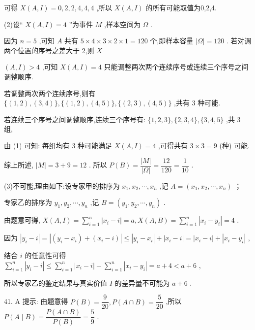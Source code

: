可得 $X\left( {A,I}\right)  = 0,2,2,4,4,4$ ,所以 $X\left( {A,I}\right)$ 的所有可能取值为0,2,4.

(2)设“ $X\left( {A,I}\right)  = 4$ ”为事件 $M$ ,样本空间为 $\Omega$ .

因为 $n = 5$ ,可知 $A$ 共有 $5 \times  4 \times  3 \times  2 \times  1 = {120}$ 个,即样本容量 $\left| \Omega \right|  = {120}$ . 若对调两个位置的序号之差大于 2,则 $X$

$\left( {A,I}\right)  > 4$ ,可知 $X\left( {A,I}\right)  = 4$ 只能调整两次两个连续序号或连续三个序号之间调整顺序.

若调整两次两个连续序号,则有 $\{ \left( {1,2}\right) ,\left( {3,4}\right) \} ,\{ \left( {1,2}\right) ,\left( {4,5}\right) \} ,\{ \left( {2,3}\right) ,\left( {4,5}\right) \}$ ,共有 3 种可能.

若连续三个序号之间调整顺序,连续三个序号有: $\{ 1,2,3\} ,\{ 2,3,4\} ,\{ 3,4,5\}$ ,共 3 组,

由 (1) 可知: 每组均有 3 种可能满足 $X\left( {A,I}\right)  = 4$ ,可得共有 $3 \times  3 = 9$ (种) 可能.

综上所述, $\left| M\right|  = 3 + 9 = {12}$ . 所以 $P\left( B\right)  = \dfrac{\left| M\right| }{\left| \Omega \right| } = \dfrac{12}{120} = \dfrac{1}{10}$ .

(3)不可能,理由如下:设专家甲的排序为 ${x}_{1},{x}_{2},\cdots ,{x}_{n}$ ,记 $A = \left( {{x}_{1},{x}_{2},\cdots ,{x}_{n}}\right)$ ；

专家乙的排序为 ${y}_{1},{y}_{2},\cdots ,{y}_{n}$ ,记 $B = \left( {{y}_{1},{y}_{2},\cdots ,{y}_{n}}\right)$ .

由题意可得, $X\left( {A,I}\right)  = \mathop{\sum }\limits_{{i = 1}}^{n}\left| {{x}_{i} - i}\right|  = a,X\left( {A,B}\right)  = \mathop{\sum }\limits_{{i = 1}}^{n}\left| {{x}_{i} - {y}_{i}}\right|  = 4$ .

因为 $\left| {{y}_{i} - i}\right|  = \left| {\left( {{y}_{i} - {x}_{i}}\right)  + \left( {{x}_{i} - i}\right) }\right|  \leq  \left| {{y}_{i} - {x}_{i}}\right|  + \left| {{x}_{i} - i}\right|  = \left| {{x}_{i} - i}\right|  + \left| {{x}_{i} - {y}_{i}}\right|$ ,

结合 $i$ 的任意性可得 $\mathop{\sum }\limits_{{i = 1}}^{n}\left| {{y}_{i} - i}\right|  \leq  \mathop{\sum }\limits_{{i = 1}}^{n}\left| {{x}_{i} - i}\right|  + \mathop{\sum }\limits_{{i = 1}}^{n}\left| {{x}_{i} - {y}_{i}}\right|  = a + 4 < a + 6$ ,

所以专家乙的鉴定结果与真实价值 $I$ 的差异量不可能为 $a + 6$ .

41. A 提示: 由题意得 $P\left( B\right)  = \dfrac{9}{20},P\left( {A \cap  B}\right)  = \dfrac{5}{20}$ ,所以 $P\left( {A \mid  B}\right)  = \dfrac{P\left( {A \cap  B}\right) }{P\left( B\right) } = \dfrac{5}{9}$ .

